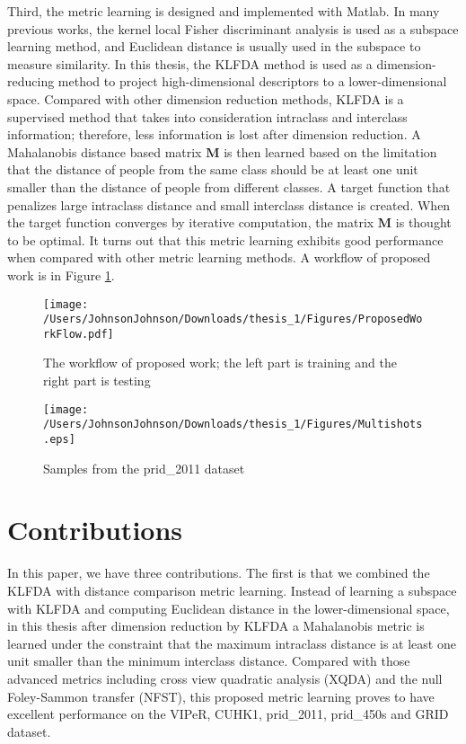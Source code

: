 Third, the metric learning is designed and implemented with Matlab. In many previous works, the kernel local Fisher discriminant analysis is used as a subspace learning method, and Euclidean distance is usually used in the subspace to measure similarity. In this thesis, the KLFDA \cite{KLFDA} method is used as a dimension-reducing method to project high-dimensional descriptors to a lower-dimensional space. Compared with other dimension reduction methods, KLFDA is a supervised method that takes into consideration intraclass and interclass information; therefore, less information is lost after dimension reduction. A Mahalanobis distance based matrix $\bm{M}$ is then learned based on the limitation that the distance of people from the same class should be at least one unit smaller than the distance of people from different classes. A target function that penalizes large intraclass distance and small interclass distance is created. When the target function converges by iterative computation, the matrix $\bm{M}$ is thought to be optimal. It turns out that this metric learning exhibits good performance when compared with other metric learning methods. A workflow of proposed work is in Figure \ref{ProposedWorkflow}.

\begin{figure}[H]

\texttt{[image: /Users/JohnsonJohnson/Downloads/thesis\_1/Figures/ProposedWorkFlow.pdf]}
\vspace{-2em}
\caption{The workflow of proposed work; the left part is training and the right part is testing}
\label{ProposedWorkflow}

\end{figure}
\begin{figure}[H]

\texttt{[image: /Users/JohnsonJohnson/Downloads/thesis\_1/Figures/Multishots.eps]}
\vspace{-2em}
\caption{Samples from the prid\_2011 dataset}

\end{figure}


\section{Contributions}

In this paper, we have three contributions. The first is that we combined the KLFDA with distance comparison metric learning. Instead of learning a subspace with KLFDA and computing Euclidean distance in the lower-dimensional space, in this thesis after dimension reduction by KLFDA a Mahalanobis metric is learned under the constraint that the maximum intraclass distance is at least one unit smaller than the minimum interclass distance. Compared with those advanced metrics including cross view quadratic analysis (XQDA) \cite{LOMO} and the null Foley-Sammon transfer (NFST), this proposed metric learning proves to have excellent performance on the VIPeR, CUHK1, prid\_2011, prid\_450s and GRID dataset.

